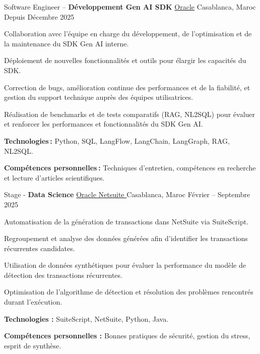 \begin{cventries}
\cventry
    {Software Engineer – \textbf{Développement Gen AI SDK}} %
    {\href{https://www.oracle.com/}{Oracle}}%
    {Casablanca, Maroc} %
    {Depuis Décembre 2025} %
    {
      \begin{cvitems}
        \item {Collaboration avec l’équipe en charge du développement, de l’optimisation et de la maintenance du SDK Gen AI interne.}
        \item {Déploiement de nouvelles fonctionnalités et outils pour élargir les capacités du SDK.}
        \item {Correction de bugs, amélioration continue des performances et de la fiabilité, et gestion du support technique auprès des équipes utilisatrices.}
        \item {Réalisation de benchmarks et de tests comparatifs (RAG, NL2SQL) pour évaluer et renforcer les performances et fonctionnalités du SDK Gen AI.}
        \item {\textbf{Technologies :} Python, SQL, LangFlow, LangChain, LangGraph, RAG, NL2SQL.}
        \item {\textbf{Compétences personnelles :} Techniques d’entretien, compétences en recherche et lecture d’articles scientifiques.}
      \end{cvitems}
    }

\vspace{0.5cm}
\cventry
    {Stage - \textbf{Data Science}} %
    {\href{https://www.oracle.com/}{Oracle Netsuite }}%
    {Casablanca, Maroc} %
    {Février -- Septembre 2025} %
    {
      \begin{cvitems}
        \item {Automatisation de la génération de transactions dans NetSuite via SuiteScript.}
        \item {Regroupement et analyse des données générées afin d’identifier les transactions récurrentes candidates.}
        \item {Utilisation de données synthétiques pour évaluer la performance du modèle de détection des transactions récurrentes.}
        \item {Optimisation de l’algorithme de détection et résolution des problèmes rencontrés durant l’exécution.}
        \item {\textbf{Technologies :} SuiteScript, NetSuite, Python, Java.}
        \item {\textbf{Compétences personnelles :} Bonnes pratiques de sécurité, gestion du stress, esprit de synthèse.}
      \end{cvitems}
    }


\end{cventries}
